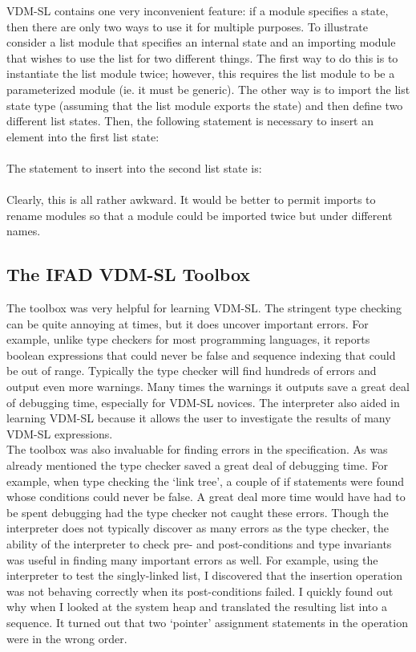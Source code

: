 \documentclass[11pt]{article}
\begin{document}
VDM-SL contains one very inconvenient feature:  if a module specifies a state, then there are only two ways to use it for multiple purposes.  To illustrate consider a list module that specifies an internal state and an importing module that wishes to use the list for two different things.  The first way to do this is to instantiate the list module twice; however, this requires the list module to be a parameterized module (ie. it must be generic).  The other way is to import the list state type (assuming that the list module exports the state) and then define two different list states.  Then, the following statement is necessary to insert an element into the first list state:\\
\hspace*{7mm}{\tt List`Insert('a') using List`state1;}\\
The statement to insert into the second list state is:\\
\hspace*{7mm}{\tt List`Insert('a') using List`state2;}\\
Clearly, this is all rather awkward.  It would be better to permit imports to rename modules so that a module could be imported twice but under different names.  
     
\subsection{The IFAD VDM-SL Toolbox}
The toolbox was very helpful for learning VDM-SL.  The stringent type checking can be quite annoying at times, but it does uncover important errors.  For example, unlike type checkers for most programming languages, it reports boolean expressions that could never be false and sequence indexing that could be out of range.  Typically the type checker will find hundreds of errors and output even more warnings.  Many times the warnings it outputs save a great deal of debugging time, especially for VDM-SL novices.  The interpreter also aided in learning VDM-SL because it allows the user to investigate the results of many VDM-SL expressions.\\

The toolbox was also invaluable for finding errors in the specification.  As was already mentioned the type checker saved a great deal of debugging time.  For example, when type checking the `link tree', a couple of if statements were found whose conditions could never be false.  A great deal more time would have had to be spent debugging had the type checker not caught these errors. Though the interpreter does not typically discover as many errors as the type checker, the ability of the interpreter to check pre- and post-conditions and type invariants was useful in finding many important errors as well.  For example, using the interpreter to test the singly-linked list, I discovered that the insertion operation was not behaving correctly when its post-conditions failed.  I quickly found out why when I looked at the system heap and translated the resulting list into a sequence.  It turned out that two `pointer' assignment statements in the operation were in the wrong order.  \\
\end{document}
